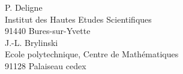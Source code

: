 \documentclass[10pt,a4paper]{article}
\begin{document}
\vspace{2em}
\begin{flushright}
\begin{minipage}{0.48\textwidth}
P. Deligne\\
Institut des Hautes Etudes Scientifiques\\
91440 Bures-sur-Yvette\\[0.6em]
J.-L. Brylinski\\
Ecole polytechnique, Centre de Mathématiques\\
91128 Palaiseau cedex
\end{minipage}
\end{flushright}

\vfill

\end{document}
